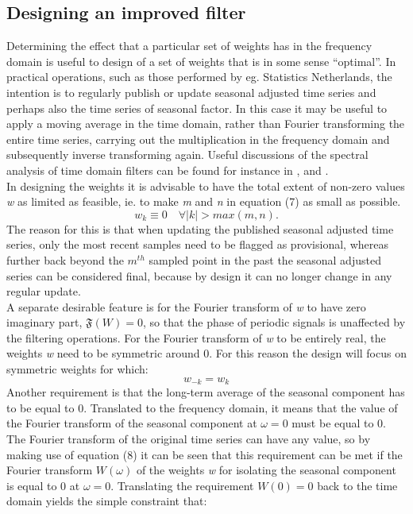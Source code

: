 \documentclass[english,blauw]{cbsdiscussionpaper}
\begin{document}
\subsection{ Designing an improved filter}
Determining the effect that a particular set of weights has in the frequency domain is useful to design of a set of weights that is in some sense ``optimal''. In practical operations, such as those performed by eg. Statistics Netherlands, the intention is to regularly publish or update seasonal adjusted time series and perhaps also the time series of seasonal factor. In this case it may be useful to apply a moving average in the time domain, rather than Fourier transforming the entire time series, carrying out the multiplication in the frequency domain and subsequently inverse transforming again. Useful discussions of the spectral analysis of time domain filters can be found for instance in \citep{gre1970},\citep{shueal2011} and \citep{fineal2006}.\\In designing the weights it is advisable  to have the total extent of non-zero values \textit{w} as limited as feasible, ie. to make \textit{m} and \textit{n} in equation (7) as small as possible.
\begin{equation}
w_k \equiv 0 \quad \forall |k| > max(m,n).
\end{equation}
The reason for this is that when updating the published seasonal adjusted time series, only the most recent samples need to be flagged as provisional, whereas further back beyond the $m^{th}$ sampled point in the past the seasonal adjusted series can be considered final, because by design it can no longer change in any regular update.\\A separate desirable feature is for the Fourier transform of \textit{w} to have zero imaginary part, $\mathfrak{F}(W) = 0$, so that the phase of periodic signals is unaffected by the filtering operations. For the Fourier transform of \textit{w} to be entirely real, the weights \textit{w} need to be symmetric around 0. For this reason the design will focus on symmetric weights for which:
\begin{equation}
w_{-k} = w_k
\end{equation}
Another requirement is that the long-term average of the seasonal component has to be equal to 0. Translated to the frequency domain, it means that the value of the Fourier transform of the seasonal component at $\omega=0$ must be equal to 0. The Fourier transform of the original time series can have any value, so by making use of equation (8) it can be seen that this requirement can be met if the Fourier transform $W(\omega)$ of the weights \textit{w} for isolating the seasonal component is equal to 0 at $\omega=0$.  Translating the requirement $W(0)=0$ back to the time domain yields the simple constraint that:
\end{document}
